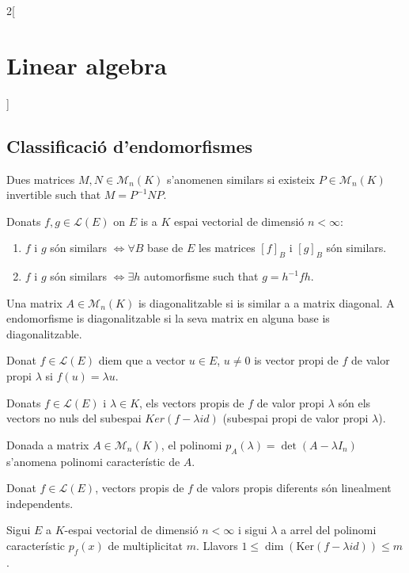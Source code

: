 \documentclass[../../../main.tex]{subfiles}
\begin{document}
\begin{multicols}{2}[\section{Linear algebra}]
\subsection{Classificació d'endomorfismes}
\begin{definition}
Dues matrices $M,N\in\mathcal{M}_n(K)$ s'anomenen similars si existeix $P\in\mathcal{M}_n(K)$ invertible such that $M=P^{-1}NP$.
\end{definition}
\begin{prop}
Donats $f,g\in\mathcal{L}(E)$ on $E$ is a $K$ espai vectorial de dimensió $n<\infty$:
\begin{enumerate}
    \item $f$ i $g$ són similars $\iff\forall B$ base de $E$ les matrices $[f]_B$ i $[g]_B$ són similars.
    \item $f$ i $g$ són similars $\iff\exists h$ automorfisme such that $g=h^{-1}fh$.
\end{enumerate}
\end{prop}
\begin{definition}
Una matrix $A\in\mathcal{M}_n(K)$ is diagonalitzable si is similar a a matrix diagonal. A endomorfisme is diagonalitzable si la seva matrix en alguna base is diagonalitzable.
\end{definition}
\begin{definition}
Donat $f\in\mathcal{L}(E)$ diem que a vector $u\in E$, $u\ne 0$ is vector propi de $f$ de valor propi $\lambda$ si $f(u)=\lambda u$.
\end{definition}
\begin{lemma}
Donats $f\in\mathcal{L}(E)$ i $\lambda\in K$, els vectors propis de $f$ de valor propi $\lambda$ són els vectors no nuls del subespai $Ker(f-\lambda id)$ (subespai propi de valor propi $\lambda$).
\end{lemma}
\begin{definition}
Donada a matrix $A\in\mathcal{M}_n(K)$, el polinomi $p_A(\lambda)=\det(A-\lambda I_n)$ s'anomena polinomi característic de $A$.
\end{definition}
\begin{prop}
Donat $f\in\mathcal{L}(E)$, vectors propis de $f$ de valors propis diferents són linealment independents.
\end{prop}
\begin{prop}
Sigui $E$ a $K$-espai vectorial de dimensió $n<\infty$ i sigui $\lambda$ a arrel del polinomi característic $p_f(x)$ de multiplicitat $m$. Llavors $1\leq \dim(\text{Ker}(f-\lambda id))\leq m$.
\end{prop}

\end{multicols}
\end{document}
